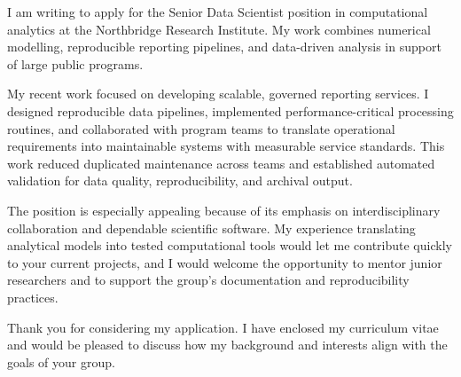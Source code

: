 \documentclass{careerdossier-letter}
\begin{document}
\MakeCDossierLetterhead

I am writing to apply for the Senior Data Scientist position in computational
analytics at the Northbridge Research Institute. My work combines numerical
modelling, reproducible reporting pipelines, and data-driven analysis in support
of large public programs.

My recent work focused on developing scalable, governed reporting services. I
designed reproducible data pipelines, implemented performance-critical
processing routines, and collaborated with program teams to translate
operational requirements into maintainable systems with measurable service
standards. This work reduced duplicated maintenance across teams and established
automated validation for data quality, reproducibility, and archival output.

The position is especially appealing because of its emphasis on interdisciplinary
collaboration and dependable scientific software. My experience translating
analytical models into tested computational tools would let me contribute
quickly to your current projects, and I would welcome the opportunity to mentor
junior researchers and to support the group's documentation and reproducibility
practices.

Thank you for considering my application. I have enclosed my curriculum vitae and
would be pleased to discuss how my background and interests align with the goals
of your group.

\MakeCDossierClosing
\end{document}
